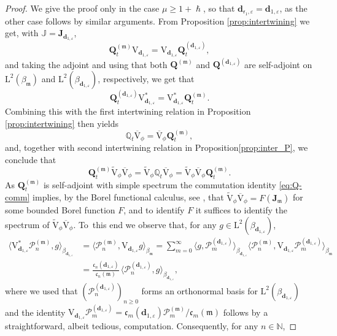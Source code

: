 \documentclass[10pt]{amsart}
\let\epsilon\varepsilon
\theoremstyle{plain}
\theoremstyle{definition}
\newcommand{\N}{\mathbb{N}}
\renewcommand{\P}{\mathcal{P}}
\newcommand{\J}{\mathds{Q}}
\newcommand{\calJ}{\mathds{J}}
\newcommand{\Leb}{\mathrm{L}}
\newcommand{\calJd}{\mathbf{J}}
\newcommand{\m}{\mathfrak{m}}
\newcommand{\dpt}{\bm{d}_{\vat,\epsilon}}
\newcommand{\dz}{{\bm{d}}_{1,\epsilon}}
\newcommand{\lam}{{\bm{\lambda}_1}}
\newcommand{\vat}{{\mathsf{r}_1}}
\newcommand{\Q}[1][\mo]{\mathbf{Q}^{({#1})}}
\newcommand{\gab}[1][\lam,\mo]{{\beta_{#1}}}
\let\h\hslash
\let\mo\mu
\begin{document}
\begin{proof}
We give the proof only in the case $\mo \geq 1+\h$, so that $\dpt = \dz$, as the other case follows by similar arguments. From Proposition \ref{prop:intertwining} we get, with $\calJ = \calJd_{\dz}$,
\begin{equation*}
\Q[\m]_t \mathrm{V}_{\dz} = \mathrm{V}_{\dz} \Q[\dz]_t,
\end{equation*}
and taking the adjoint and using that both $\Q[\m]$ and $\Q[\dz]$ are self-adjoint on $\Leb^2(\gab[\m])$ and $\Leb^2(\gab[\dz])$, respectively, we get that
\begin{equation*}
\Q[\dz]_t \mathrm{V}_{\dz}^* = \mathrm{V}_{\dz}^* \Q[\m]_t.
\end{equation*}
Combining this with the first intertwining relation in Proposition \ref{prop:intertwining} then yields
\begin{equation*}
\J_t \overline{\mathrm{V}}_{\phi} = \overline{\mathrm{V}}_{\phi} \Q[\m]_t,
\end{equation*}
and, together with second intertwining relation in Proposition\ref{prop:inter_P}, we conclude that
\begin{equation}
\label{eq:Q-comm}
\Q[\m]_t \widetilde{\mathrm{V}}_{\phi}\overline{\mathrm{V}}_{\phi} = \widetilde{\mathrm{V}}_{\phi} \J_t \overline{\mathrm{V}}_{\phi} = \widetilde{\mathrm{V}}_{\phi}\overline{\mathrm{V}}_{\phi} \Q[\m]_t.
\end{equation}
As $\Q[\m]_t$ is self-adjoint with simple spectrum the commutation identity \eqref{eq:Q-comm} implies, by the Borel functional calculus, see \eg \cite{Rudin1973}, that $\widetilde{\mathrm{V}}_{\phi}\overline{\mathrm{V}}_{\phi} = F(\calJd_{\m})$ for some bounded Borel function $F$, and to identify $F$ it suffices to identify the spectrum of $\widetilde{\mathrm{V}}_{\phi}\overline{\mathrm{V}}_{\phi}$. To~this end we observe that, for any $g \in \Leb^2(\gab[\dz])$,
\begin{align*}
\langle \mathrm{V}_{\dz}^* \P_n^{(\m)}, g \rangle_{\gab[\dz]} &= \langle \P_n^{(\m)}, \mathrm{V}_{\dz} g \rangle_{\gab[\m]} = \sum_{m=0}^\infty \langle g, \P_m^{(\dz)} \rangle_{\gab[\dz]} \langle \P_n^{(\m)}, \mathrm{V}_{\dz} \P_m^{(\dz)} \rangle_{\gab[\m]} \\ & = \frac{\mathfrak{c}_n(\dz)}{\mathfrak{c}_n(\m)}\, \langle \P_n^{(\dz)},g \rangle_{\gab[\dz]},
\end{align*}
where we used that $(\P_n^{(\dz)})_{n \geq 0}$ forms an orthonormal basis for $\Leb^2(\gab[\dz])$ and the identity $\mathrm{V}_{\dz} \P_m^{(\dz)} = {\mathfrak{c}_m(\dz)} \P_m^{(\m)} / {\mathfrak{c}_m(\m)}$ follows by a straightforward, albeit tedious, computation. Consequently, for any $n \in \N$,

\end{proof}
\end{document}
